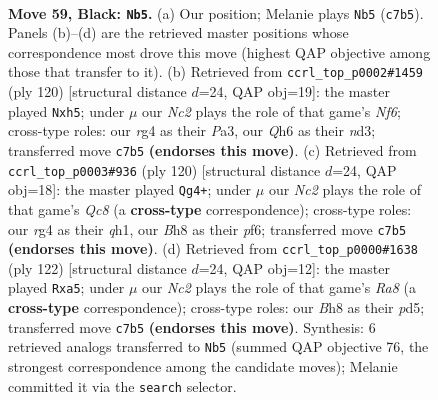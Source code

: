 \documentclass[11pt]{article}
\begin{document}
\clearpage

\begin{figure}[p]\centering
\begin{subfigure}{0.46\textwidth}\centering
\resizebox{\linewidth}{!}{%
\newchessgame
\chessboard[
  setfen={5k1b/2n2p2/7q/3P4/6R1/8/8/5K2 b - - 5 59},
  showmover=false,
  pgfstyle=straightmove, color=movearrow, markmove={c7-b5}
]}
\caption{}
\end{subfigure}\hfill
\begin{subfigure}{0.46\textwidth}\centering
\resizebox{\linewidth}{!}{%
\newchessgame
\chessboard[
  setfen={8/1k6/5N2/6pp/8/P2n3P/6K1/8 w - - 2 61},
  showmover=false,
  pgfstyle=straightmove, color=movearrow, markmove={f6-h5}
]}
\caption{}
\end{subfigure}
\\[4pt]
\begin{subfigure}{0.46\textwidth}\centering
\resizebox{\linewidth}{!}{%
\newchessgame
\chessboard[
  setfen={2Q5/6k1/p4p2/2K5/P7/8/8/7q w - - 0 61},
  showmover=false,
  pgfstyle=straightmove, color=movearrow, markmove={c8-g4}
]}
\caption{}
\end{subfigure}\hfill
\begin{subfigure}{0.46\textwidth}\centering
\resizebox{\linewidth}{!}{%
\newchessgame
\chessboard[
  setfen={R7/8/8/p2p3k/3P4/2K5/4r3/8 w - - 0 62},
  showmover=false,
  pgfstyle=straightmove, color=movearrow, markmove={a8-a5}
]}
\caption{}
\end{subfigure}
\caption{\textbf{Move 59, Black: \texttt{Nb5}.} (a) Our position; Melanie plays \texttt{Nb5} (\texttt{c7b5}). Panels (b)--(d) are the retrieved master positions whose correspondence most drove this move (highest QAP objective among those that transfer to it). (b) Retrieved from \texttt{ccrl\_top\_p0002\#1459} (ply 120) [structural distance $d$=24, QAP obj=19]: the master played \texttt{Nxh5}; under $\mu$ our \emph{Nc2} plays the role of that game's \emph{Nf6}; cross-type roles: our \emph{r}g4 as their \emph{P}a3, our \emph{Q}h6 as their \emph{n}d3; transferred move \texttt{c7b5} \textbf{(endorses this move)}. (c) Retrieved from \texttt{ccrl\_top\_p0003\#936} (ply 120) [structural distance $d$=24, QAP obj=18]: the master played \texttt{Qg4+}; under $\mu$ our \emph{Nc2} plays the role of that game's \emph{Qc8} (a \textbf{cross-type} correspondence); cross-type roles: our \emph{r}g4 as their \emph{q}h1, our \emph{B}h8 as their \emph{p}f6; transferred move \texttt{c7b5} \textbf{(endorses this move)}. (d) Retrieved from \texttt{ccrl\_top\_p0000\#1638} (ply 122) [structural distance $d$=24, QAP obj=12]: the master played \texttt{Rxa5}; under $\mu$ our \emph{Nc2} plays the role of that game's \emph{Ra8} (a \textbf{cross-type} correspondence); cross-type roles: our \emph{B}h8 as their \emph{p}d5; transferred move \texttt{c7b5} \textbf{(endorses this move)}. Synthesis: 6 retrieved analogs transferred to \texttt{Nb5} (summed QAP objective 76, the strongest correspondence among the candidate moves); Melanie committed it via the \texttt{search} selector.}
\label{fig:thought-m117}
\end{figure}
\end{document}
